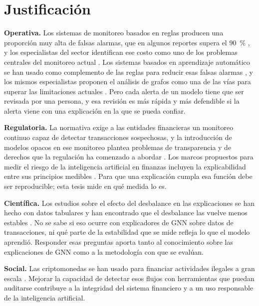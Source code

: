 \section{Justificación}

\textbf{Operativa.} Los sistemas de monitoreo basados en reglas producen una proporción muy alta
de falsas alarmas, que en algunos reportes supera el 90~\% \cite{Ketenci2021TimeFrequency}, y los
especialistas del sector identifican ese costo como uno de los problemas centrales del
monitoreo actual \cite{Oztas2024Monitoring}. Los sistemas basados en aprendizaje automático se han usado como complemento de las reglas para reducir esas falsas alarmas \cite{Labanca2022Amaretto}, y los mismos especialistas proponen el análisis de grafos como una de las vías para superar las limitaciones actuales \cite{Oztas2024Monitoring}. Pero cada alerta de un modelo tiene que ser
revisada por una persona, y esa revisión es más rápida y más defendible si la alerta viene con
una explicación en la que se pueda confiar.

\textbf{Regulatoria.} La normativa exige a las entidades financieras un monitoreo continuo capaz
de detectar transacciones sospechosas, y la introducción de modelos opacos en ese monitoreo
plantea problemas de transparencia y de derechos que la regulación ha comenzado a abordar
\cite{Bertrand2021Rights}. Los marcos propuestos para medir el riesgo de la inteligencia
artificial en finanzas incluyen la explicabilidad entre sus principios medibles
\cite{Giudici2023Risk}. Para que una explicación cumpla esa función debe ser reproducible; esta
tesis mide en qué medida lo es.

\textbf{Científica.} Los estudios sobre el efecto del desbalance en las explicaciones se han
hecho con datos tabulares y han encontrado que el desbalance las vuelve menos estables
\cite{Chen2023CreditImbalance}. No se sabe si eso ocurre con explicadores de GNN sobre datos de
transacciones, ni qué parte de la estabilidad que se mide refleja lo que el modelo aprendió.
Responder esas preguntas aporta tanto al conocimiento sobre las explicaciones de GNN como a la
metodología con que se evalúan.

\textbf{Social.} Las criptomonedas se han usado para financiar actividades ilegales a gran escala
\cite{Foley2019Bitcoin, PaquetClouston2019Ransomware}. Mejorar la capacidad de detectar esos
flujos con herramientas que puedan auditarse contribuye a la integridad del sistema financiero
y a un uso responsable de la inteligencia artificial.

